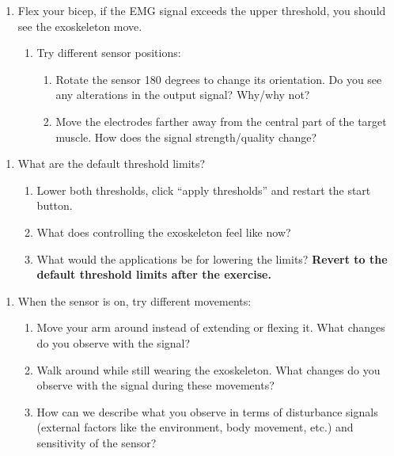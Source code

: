 \begin{enumerate}[]
	\item Flex your bicep, if the EMG signal exceeds the upper threshold, you should see the exoskeleton move.  
	\begin{enumerate}[]
		\item Try different sensor positions:  
		\begin{enumerate}[]
			\item Rotate the sensor 180 degrees to change its orientation. 
			Do you see any alterations in the output signal? Why/why not? 
			\item Move the electrodes farther away from the central part of the target muscle. 
			How does the signal strength/quality change? 
		\end{enumerate}
	\end{enumerate}
\end{enumerate}
	
\begin{enumerate}[]
	\item What are the default threshold limits?  
	\begin{enumerate}[]
			\item Lower both thresholds, click “apply thresholds” and restart the start button. 
			\item What does controlling the exoskeleton feel like now? 
			\item What would the applications be for lowering the limits? 
			\textbf{Revert to the default threshold limits after the exercise.} 
	\end{enumerate}
\end{enumerate}

\begin{enumerate}[]
	\item 	When the sensor is on, try different movements: 
	\begin{enumerate}[]
		\item Move your arm around instead of extending or flexing it. What changes do you observe with the signal? 
		\item Walk around while still wearing the exoskeleton. What changes do you observe with the signal during these movements? 
		\item How can we describe what you observe in terms of disturbance signals (external factors like the environment, body movement, etc.) and sensitivity of the sensor? 	
	\end{enumerate}
\end{enumerate}

